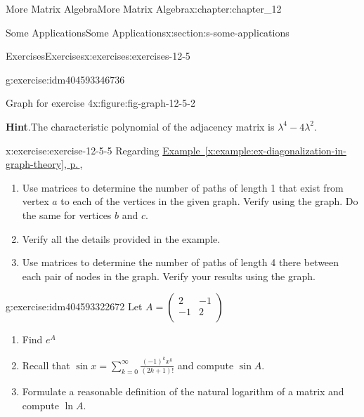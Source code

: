 \documentclass[twoside,10pt,]{book}
\newcommand{\blocktitlefont}{\relax}
\newcommand{\xreffont}{\relax}
\numberwithin{equation}{section}
\begin{document}
\begin{chapterptx}{More Matrix Algebra}{}{More Matrix Algebra}{}{}{x:chapter:chapter_12}
\begin{sectionptx}{Some Applications}{}{Some Applications}{}{}{x:section:s-some-applications}
\begin{exercises-subsection}{Exercises}{}{Exercises}{}{}{x:exercises:exercises-12-5}
\begin{divisionexercise}{4}{}{}{g:exercise:idm404593346736}
\begin{figureptx}{Graph for exercise 4}{x:figure:fig-graph-12-5-2}{}
\end{figureptx}%
\par\smallskip%
\noindent\textbf{\blocktitlefont Hint}.\label{g:hint:idm404593344160}{}\hypertarget{g:hint:idm404593344160}{}\quad{}The characteristic polynomial of the adjacency matrix is \(\lambda ^4 - 4 \lambda^2\).%
\end{divisionexercise}%
\begin{divisionexercise}{5}{}{}{x:exercise:exercise-12-5-5}%
Regarding \hyperref[x:example:ex-diagonalization-in-graph-theory]{Example~{\xreffont\ref{x:example:ex-diagonalization-in-graph-theory}}, p.\,\pageref{x:example:ex-diagonalization-in-graph-theory}},%
\begin{enumerate}[label=(\alph*)]
\item{}Use matrices to determine the number of paths of length 1 that exist from vertex \(a\) to each of the vertices in the given graph. Verify using the graph. Do the same for vertices \(b\) and \(c\).%
\item{}Verify all the details provided in the example.%
\item{}Use matrices to determine the number of paths of length 4 there between each pair of nodes in the graph. Verify your results using the graph.%
\end{enumerate}
%
\end{divisionexercise}%
\begin{divisionexercise}{6}{}{}{g:exercise:idm404593322672}%
Let \(A =\left(
\begin{array}{cc}
2 & -1 \\
-1 & 2 \\
\end{array}
\right)\)%
\begin{enumerate}[label=(\alph*)]
\item{}Find \(e^A\)%
\item{}Recall that \(\sin  x = \sum _{k=0}^{\infty } \frac{(-1)^k x^k}{(2 k+1)!}\)  and compute \(\sin  A\).%
\item{}Formulate a reasonable definition of the natural logarithm of a matrix and compute \(\ln  A\).%
\end{enumerate}
%
\end{divisionexercise}%
\end{exercises-subsection}
\end{sectionptx}
\end{chapterptx}
\end{document}
